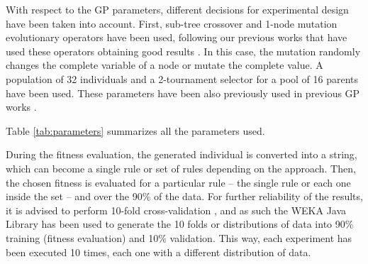 \documentclass[a4paper,10pt,twocolumn,preprint,3p]{elsarticle}
\begin{document}
With respect to the GP parameters, different decisions for experimental design have been taken into account. 
First, sub-tree crossover and 1-node mutation evolutionary operators have
been used, following our previous works that have used these operators
obtaining good results \cite{EvoStar2014:GPBot}. In this case, the
mutation randomly changes the complete variable of a node or mutate
the complete value. A population of 32 individuals and a 2-tournament selector for a pool of
16 parents have been used. These parameters have been also previously used in previous GP works \cite{EvoStar2014:GPBot}.

Table \ref{tab:parameters} summarizes all the parameters used.

\begin{table}
\begin{center}
\caption{Parameters used in the experiments.}
\label{tab:parameters}
\end{center}
\end{table}

During the fitness evaluation, the generated individual is converted
into a string, which can become a single rule or set of rules
depending on the approach. %
Then, the chosen fitness is evaluated for a particular rule -- the single rule or each one inside the set -- and over the 90\% of the data.
For further reliability of the results, it is advised to perform
10-fold cross-validation \cite{kohavi1995study}, and as such the WEKA
Java Library \cite{HallWEKA09} has been used to generate the 10 folds
or distributions of data into 90\% training (fitness evaluation) and
10\% validation. This way, each experiment has been executed 10 times,
each one with a different distribution of data.
\end{document}
